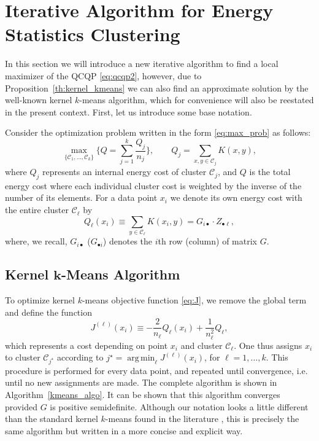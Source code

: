 \documentclass[aps,preprint,nofootinbib,floatfix]{revtex4-1}
\DeclareMathOperator*{\argmin}{arg\,min}
\newcommand\kk{K}
\newcommand\C{{\mathcal{C}}}
\begin{document}
\section{Iterative Algorithm for Energy Statistics Clustering}
\label{sec:algo}

In this section we will introduce a new iterative algorithm to find a local
maximizer of the QCQP \eqref{eq:qcqp2}, however, due to 
Proposition~\ref{th:kernel_kmeans} we can also find an approximate
solution by the well-known kernel $k$-means algorithm, which 
for convenience
will also be reestated in the present context.
First, let us introduce some base notation.

Consider the optimization problem 
written in the form \eqref{eq:max_prob} as follows:
\begin{equation}
\label{eq:maxQ}
\max_{\{ \C_1,\dotsc,\C_k \}} 
\bigg\{ Q = \sum_{j=1}^k \dfrac{Q_j}{n_j}  \bigg\},
\qquad Q_j = \sum_{x,y\in\C_j} \kk(x,y),
\end{equation}
where $Q_j$ represents an internal energy cost of cluster $\C_j$, and
$Q$ is the total energy cost where each individual cluster cost 
is weighted by the inverse
of the number of its elements. For a data point $x_i$ we denote
its own energy cost
with the entire cluster $\C_\ell$ by
\begin{equation}
\label{eq:costxij}
Q_\ell(x_i) \equiv \sum_{y\in\C_\ell} \kk(x_i, y) = 
G_{i \bullet} \cdot Z_{\bullet \ell},
\end{equation}
where, we recall, $G_{i\bullet}$ ($G_{\bullet i}$) denotes
the $i$th row (column) of matrix $G$.

\subsection{Kernel $\bm{k}$-Means Algorithm}

To optimize kernel $k$-means objective function
\eqref{eq:J}, we remove the global term and define the function
\begin{equation}
\label{eq:Jell}
J^{(\ell)}(x_i) \equiv -\dfrac{2}{n_\ell} Q_\ell(x_i) + \dfrac{1}{n_\ell^2}
Q_\ell,
\end{equation}
which represents a cost depending on point $x_i$ and cluster $\C_\ell$. One
thus assigns  $x_i$ to cluster $\C_{j^\star}$ according
to $j^\star = \argmin_\ell J^{(\ell)}(x_i)$, for $\ell = 1,\dotsc,k$.
This procedure is performed for every data point, and repeated until
convergence, i.e. until no new assignments are made.
The complete algorithm is shown in Algorithm~\ref{kmeans_algo}.
It can be shown that this algorithm converges provided $G$ is positive
semidefinite.
Although our notation looks a little different than the standard
kernel $k$-means found in the literature \cite{Dhillon}, this is precisely
the same algorithm but written in a more concise and explicit way.
\end{document}
